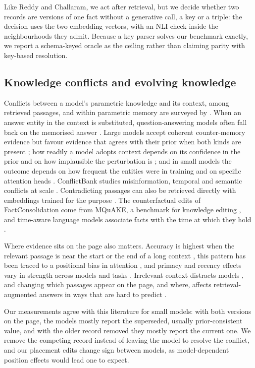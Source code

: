\documentclass{CUP-JNL-NLP}
\begin{document}
Like Reddy and Challaram, we act after retrieval, but we decide whether two records are versions of one fact without a generative call, a key or a triple: the decision uses the two embedding vectors, with an NLI check inside the neighbourhoods they admit. Because a key parser solves our benchmark exactly, we report a schema-keyed oracle as the ceiling rather than claiming parity with key-based resolution.

\subsection{Knowledge conflicts and evolving knowledge}
\label{sec:related-conflicts}

Conflicts between a model's parametric knowledge and its context, among retrieved passages, and within parametric memory are surveyed by \citet{xu2024knowledge}. When an answer entity in the context is substituted, question-answering models often fall back on the memorised answer \citep{longpre2021entity}. Large models accept coherent counter-memory evidence but favour evidence that agrees with their prior when both kinds are present \citep{xie2024adaptive}; how readily a model adopts context depends on its confidence in the prior and on how implausible the perturbation is \citep{wu2024clasheval}; and in small models the outcome depends on how frequent the entities were in training and on specific attention heads \citep{yu2023characterizing}. ConflictBank studies misinformation, temporal and semantic conflicts at scale \citep{su2024conflictbank}. Contradicting passages can also be retrieved directly with embeddings trained for the purpose \citep{xu2024sparsecl}. The counterfactual edits of FactConsolidation come from MQuAKE, a benchmark for knowledge editing \citep{zhong2023mquake}, and time-aware language models associate facts with the time at which they hold \citep{dhingra2022timeaware}.

Where evidence sits on the page also matters. Accuracy is highest when the relevant passage is near the start or the end of a long context \citep{liu2024lost}, this pattern has been traced to a positional bias in attention \citep{hsieh2024found}, and primacy and recency effects vary in strength across models and tasks \citep{guo2025serial}. Irrelevant context distracts models \citep{shi2023large}, and changing which passages appear on the page, and where, affects retrieval-augmented answers in ways that are hard to predict \citep{cuconasu2024power}.

Our measurements agree with this literature for small models: with both versions on the page, the models mostly report the superseded, usually prior-consistent value, and with the older record removed they mostly report the current one. We remove the competing record instead of leaving the model to resolve the conflict, and our placement edits change sign between models, as model-dependent position effects would lead one to expect.
\end{document}
